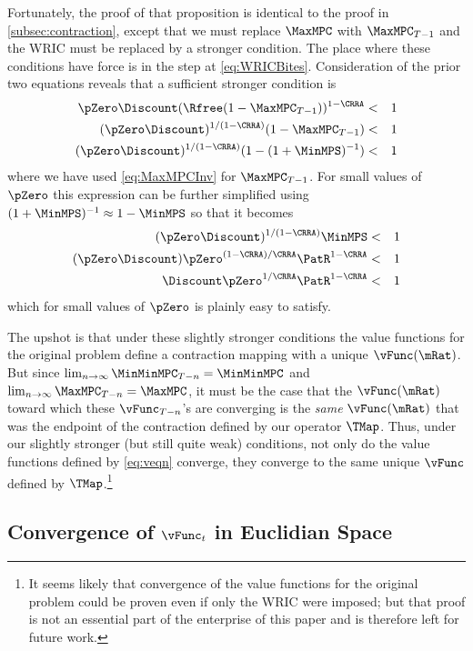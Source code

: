 \documentclass[titlepage]{\econtex}\providecommand{\texname}{BufferStockTheory}%
\begin{document}
Fortunately, the proof of that proposition is identical to the proof in
\ref{subsec:contraction}, except that we must replace
$\MaxMPC$ with $\MaxMPC_{T-1}$ and the WRIC must be
replaced by a stronger condition.  The place where these
conditions have force is in the step at \eqref{eq:WRICBites}.
Consideration of the prior two equations reveals that
a sufficient stronger condition is
\begin{eqnarray*}
    \pZero \Discount (\Rfree (1-\MaxMPC_{T-1}))^{1-\CRRA} & < & 1
\\  (\pZero \Discount)^{1/(1-\CRRA)}  (1-\MaxMPC_{T-1}) & < & 1
\\  (\pZero \Discount)^{1/(1-\CRRA)}  (1-(1+\MinMPS)^{-1}) & < & 1
\end{eqnarray*}
where we have used \eqref{eq:MaxMPCInv} for $\MaxMPC_{T-1}$.  For small values of
$\pZero$ this expression can be further simplified using $(1+\MinMPS)^{-1}
\approx 1-\MinMPS$ so that it becomes
\begin{eqnarray*}
  (\pZero \Discount)^{1/(1-\CRRA)}  \MinMPS & < & 1
\\  (\pZero \Discount)  \pZero^{(1-\CRRA)/\CRRA} \PatR^{1-\CRRA} & < & 1
\\  \Discount  \pZero^{1/\CRRA} \PatR^{1-\CRRA} & < & 1
\end{eqnarray*}
which for small values of $\pZero$ is plainly easy to satisfy.

The upshot is that under these slightly stronger conditions the value
functions for the original problem define a contraction mapping with a
unique $\vFunc(\mRat)$.  But since $\lim_{n \rightarrow \infty}
\MinMinMPC_{T-n} = \MinMinMPC$ and $\lim_{n \rightarrow \infty}
\MaxMPC_{T-n} = \MaxMPC$, it must be the case that the $\vFunc(\mRat)$
toward which these $\vFunc_{T-n}$'s are converging is the {\it same}
$\vFunc(\mRat)$ that was the endpoint of the contraction defined by
our operator $\TMap$.  Thus, under our slightly stronger (but still
quite weak) conditions, not only do the value functions defined by
\eqref{eq:veqn} converge, they converge to the same unique $\vFunc$
defined by $\TMap$.\footnote{It seems likely that convergence of the
  value functions for the original problem could be proven even if
  only the WRIC were imposed; but that proof is not an essential part
  of the enterprise of this paper and is therefore left for future
  work.}


\subsection{Convergence of $\vFunc_{t}$ in Euclidian Space}\label{sec:vEuclidian}
\end{document}
